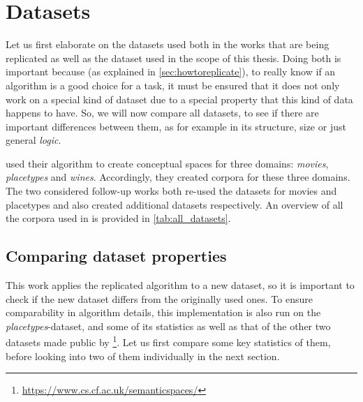 \section{Datasets}




Let us first elaborate on the datasets used both in the works that are being replicated as well as the dataset used in the scope of this thesis. Doing both is important because (as explained in \autoref{sec:howtoreplicate}), to really know if an algorithm is a good choice for a task, it must be ensured that it does not only work on a special kind of dataset due to a special property that this kind of data happens to have. So, we will now compare all datasets, to see if there are important differences between them, as for example in its structure, size or just general \emph{logic}.

\textcite{Derrac2015} used their algorithm to create conceptual spaces for three domains: \textit{movies}, \textit{placetypes} and \textit{wines}. Accordingly, they created corpora for these three domains. The two considered follow-up works both re-used the datasets for movies and placetypes and also created additional datasets respectively. An overview of all the corpora used in \mainalgos is provided in \autoref{tab:all_datasets}.


\subsection*{Comparing dataset properties}

This work applies the replicated algorithm to a new dataset, so it is important to check if the new dataset differs from the originally used ones. To ensure comparability in algorithm details, this implementation is also run on the \emph{placetypes}-dataset, and some of its statistics as well as that of the other two datasets made public by \cite{Derrac2015}\footnote{\url{https://www.cs.cf.ac.uk/semanticspaces/}}. Let us first compare some key statistics of them, before looking into two of them individually in the next section.

